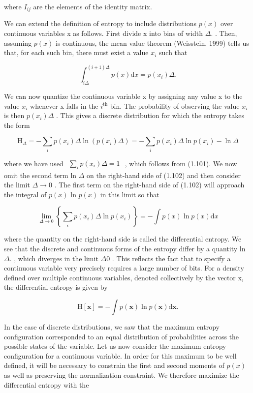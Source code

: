 \documentclass[
  10
]{article}
\begin{document}
where \(I _ { i j }\) are the elements of the identity matrix.

We can extend the definition of entropy to include distributions
\(p ( x )\) over continuous variables x as follows. First divide x into
bins of width \(\Delta .\) . Then, assuming \(p ( x )\) is continuous,
the mean value theorem (Weisstein, 1999) tells us that, for each such
bin, there must exist a value \(x _ { i }\) such that

\[
\int_ {i \Delta} ^ {(i + 1) \Delta} p (x) \mathrm{d} x = p (x _ {i}) \Delta .\tag{1.101}
\]

We can now quantize the continuous variable x by assigning any value x
to the value \(x _ { i }\) whenever x falls in the
\(i ^ { \mathrm { t h } }\) bin. The probability of observing the value
\(x _ { i }\) is then \(p ( x _ { i } ) \Delta\) . This gives a discrete
distribution for which the entropy takes the form

\[
\mathrm{H} _ {\Delta} = - \sum_ {i} p (x _ {i}) \Delta \ln {(p (x _ {i}) \Delta)} = - \sum_ {i} p (x _ {i}) \Delta \ln {p (x _ {i})} - \ln {\Delta}\tag{1.102}
\]

where we have used
\(\begin{array} { r } { \sum _ { i } p ( x _ { i } ) \Delta = 1 } \end{array}\)
, which follows from (1.101). We now omit the second term ln \(\Delta\)
on the right-hand side of (1.102) and then consider the limit
\(\Delta \to 0\) . The first term on the right-hand side of (1.102) will
approach the integral of \(p ( x )\) ln \(p ( x )\) in this limit so
that

\[
\lim _ {\Delta \rightarrow 0} \left\{\sum_ {i} p (x _ {i}) \Delta \ln p (x _ {i}) \right\} = - \int p (x) \ln p (x) \mathrm{d} x\tag{1.103}
\]

where the quantity on the right-hand side is called the differential
entropy. We see that the discrete and continuous forms of the entropy
differ by a quantity ln \(\Delta .\) , which diverges in the limit
\(\Delta  0\) . This reflects the fact that to specify a continuous
variable very precisely requires a large number of bits. For a density
defined over multiple continuous variables, denoted collectively by the
vector x, the differential entropy is given by

\[
\mathrm{H} [ \mathbf {x} ] = - \int p (\mathbf {x}) \ln p (\mathbf {x}) \mathrm{d} \mathbf {x}.\tag{1.104}
\]

In the case of discrete distributions, we saw that the maximum entropy
configuration corresponded to an equal distribution of probabilities
across the possible states of the variable. Let us now consider the
maximum entropy configuration for a continuous variable. In order for
this maximum to be well defined, it will be necessary to constrain the
first and second moments of \(p ( x )\) as well as preserving the
normalization constraint. We therefore maximize the differential entropy
with the
\end{document}
